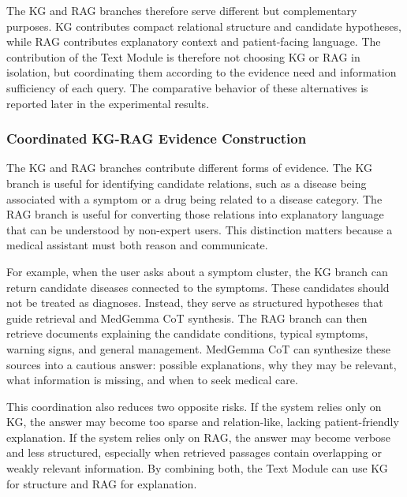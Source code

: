 The KG and RAG branches therefore serve different but complementary purposes. KG contributes compact relational structure and candidate hypotheses, while RAG contributes explanatory context and patient-facing language. The contribution of the Text Module is therefore not choosing KG or RAG in isolation, but coordinating them according to the evidence need and information sufficiency of each query. The comparative behavior of these alternatives is reported later in the experimental results.

\subsubsection{Coordinated KG-RAG Evidence Construction}

The KG and RAG branches contribute different forms of evidence. The KG branch is useful for identifying candidate relations, such as a disease being associated with a symptom or a drug being related to a disease category. The RAG branch is useful for converting those relations into explanatory language that can be understood by non-expert users. This distinction matters because a medical assistant must both reason and communicate.

For example, when the user asks about a symptom cluster, the KG branch can return candidate diseases connected to the symptoms. These candidates should not be treated as diagnoses. Instead, they serve as structured hypotheses that guide retrieval and MedGemma CoT synthesis. The RAG branch can then retrieve documents explaining the candidate conditions, typical symptoms, warning signs, and general management. MedGemma CoT can synthesize these sources into a cautious answer: possible explanations, why they may be relevant, what information is missing, and when to seek medical care.

This coordination also reduces two opposite risks. If the system relies only on KG, the answer may become too sparse and relation-like, lacking patient-friendly explanation. If the system relies only on RAG, the answer may become verbose and less structured, especially when retrieved passages contain overlapping or weakly relevant information. By combining both, the Text Module can use KG for structure and RAG for explanation.

